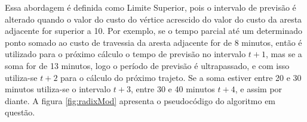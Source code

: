 Essa abordagem é definida como Limite Superior, pois o intervalo de previsão é alterado quando
o valor do custo do vértice acrescido do valor do custo da aresta adjacente for superior a 10.
Por exemplo, se o tempo parcial até um determinado ponto somado ao custo de travessia da aresta adjacente for de 8 minutos, então
é utilizado para o próximo cálculo o tempo de previsão no intervalo $t + 1$, mas se a soma for de 13 minutos, logo
o período de previsão é ultrapassado, e com isso utiliza-se $t + 2$ para o cálculo do próximo trajeto. Se a soma
estiver entre 20 e 30 minutos utiliza-se o intervalo $t + 3$, entre 30 e 40 minutos $t + 4$, e assim por diante.
A figura \ref{fig:radixMod} apresenta o pseudocódigo do algoritmo em questão.
\FloatBarrier
{}
